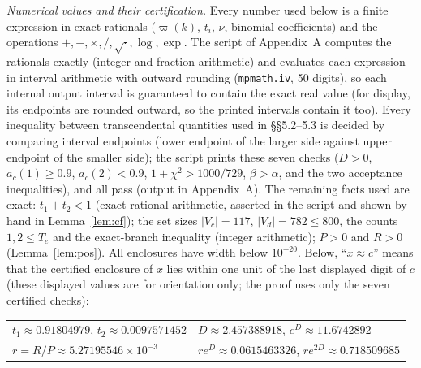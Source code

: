 \documentclass[11pt]{article}
\theoremstyle{remark}
\begin{document}
\emph{Numerical values and their certification.} Every number used below is a finite expression in exact rationals ($\varpi(k)$, $t_i$, $\nu$, binomial coefficients) and the operations $+,-,\times,/,\sqrt{\cdot},\log,\exp$. The script of Appendix~A computes the rationals exactly (integer and fraction arithmetic) and evaluates each expression in interval arithmetic with outward rounding (\texttt{mpmath.iv}, 50 digits), so each internal output interval is guaranteed to contain the exact real value (for display, its endpoints are rounded outward, so the printed intervals contain it too). Every inequality between transcendental quantities used in \S\S5.2--5.3 is decided by comparing interval endpoints (lower endpoint of the larger side against upper endpoint of the smaller side); the script prints these seven checks ($D>0$, $a_c(1)\ge0.9$, $a_c(2)<0.9$, $1+\chi^2>1000/729$, $\beta>\alpha$, and the two acceptance inequalities), and all pass (output in Appendix~A). The remaining facts used are exact: $t_1+t_2<1$ (exact rational arithmetic, asserted in the script and shown by hand in Lemma~\ref{lem:cf}); the set sizes $|V_c|=117$, $|V_d|=782\le800$, the counts $1,2\le T_e$ and the exact-branch inequality (integer arithmetic); $P>0$ and $R>0$ (Lemma~\ref{lem:pos}). All enclosures have width below $10^{-20}$. Below, ``$x\approx c$'' means that the certified enclosure of $x$ lies within one unit of the last displayed digit of $c$ (these displayed values are for orientation only; the proof uses only the seven certified checks):
\begin{center}
\begin{tabular}{ll}
$t_1\approx0.91804979$, $t_2\approx0.0097571452$ & $D\approx2.457388918$, $e^D\approx11.6742892$\\
$r=R/P\approx5.27195546\times10^{-3}$ & $re^D\approx0.0615463326$, $re^{2D}\approx0.718509685$
\end{tabular}
\end{center}
\end{document}

